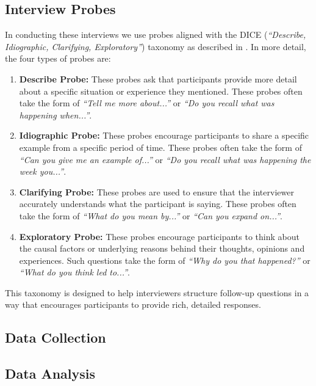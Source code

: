 \subsection{Interview Probes}\label{subsec:interview-probes}
In conducting these interviews we use probes aligned with the DICE
(\textit{``Describe, Idiographic, Clarifying, Exploratory''}) taxonomy as
described in \citet{robinson2023probing}. In more detail, the four types of
probes are:
\begin{enumerate}
  \item \textbf{Describe Probe:} These probes ask that participants provide more
    detail about a specific situation or experience they mentioned. These probes
    often take the form of \textit{``Tell me more about...''} or \textit{``Do
    you recall what was happening when...''}.
  \item \textbf{Idiographic Probe:} These probes encourage participants to share
    a specific example from a specific period of time. These probes often take
    the form of \textit{``Can you give me an example of...''} or \textit{``Do
    you recall what was happening the week you...''}.
  \item \textbf{Clarifying Probe:} These probes are used to ensure that the interviewer
    accurately understands what the participant is saying. These probes often
    take the form of \textit{``What do you mean by...''} or \textit{``Can you
    expand on...''}.
  \item \textbf{Exploratory Probe:} These probes encourage participants to think
    about the causal factors or underlying reasons behind their thoughts,
    opinions and experiences. Such questions take the form of \textit{``Why do
    you that happened?''} or \textit{``What do you think led to...''}.
\end{enumerate}
This taxonomy is designed to help interviewers structure follow-up questions in
a way that encourages participants to provide rich, detailed responses. 



\subsection{Data Collection}\label{sec:data-collection}



\subsection{Data Analysis}\label{sec:data-analysis}
